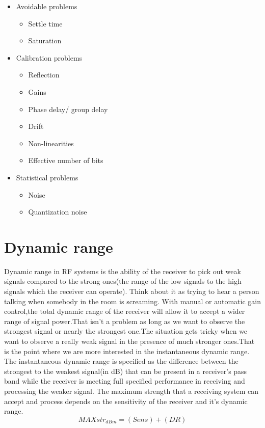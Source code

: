 %
\begin{itemize}
\item Avoidable problems
	\begin{itemize}
	\item Settle time
	\item Saturation
	\end{itemize}
\item Calibration problems
	\begin{itemize}
	\item Reflection
	\item Gains
	\item Phase delay/ group delay
	\item Drift
	\item Non-linearities
	\item Effective number of bits
	\end{itemize}
\item Statistical problems
	\begin{itemize}
	\item Noise
	\item Quantization noise
	\end{itemize}
\end{itemize}
%



\section{Dynamic range}
Dynamic range in RF systems is the ability of the receiver to pick out weak signals compared to the strong ones(the range of the low signals to the high signals which the receiver can operate). Think about it as trying to hear a person talking when somebody in the room is screaming.  
With manual or automatic gain control,the total dynamic range of the receiver will allow it to accept a wider range of signal power.That isn't a problem as long as we want to observe the strongest signal or nearly the strongest one.The situation gets tricky when we want to observe a really weak signal in the presence of much stronger ones.That is the point where we are more interested in the instantaneous dynamic range.
The instantaneous dynamic range is specified as the difference between the strongest to the weakest signal(in dB) that can be present in a receiver's pass band while the receiver is meeting full specified performance in receiving and processing the weaker signal.
The maximum strength that a receiving system can accept and process depends on the sensitivity of the receiver and it's dynamic range.
\begin{equation}
MAXstr_{dBm} = (Sens) +(DR)
\label{Max strength of a receiving system}
\end{equation}

